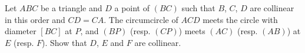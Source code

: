 Let $ABC$ be a triangle and $D$ a point of $(BC)$ such that $B$, $C$, $D$ are collinear in this order and $CD = CA$. The circumcircle of $ACD$ meets the circle with diameter $[BC]$ at $P$, and $(BP)$ (resp. $(CP)$) meets $(AC)$ (resp. $(AB)$) at $E$ (resp. $F$). Show that $D$, $E$ and $F$ are collinear.
